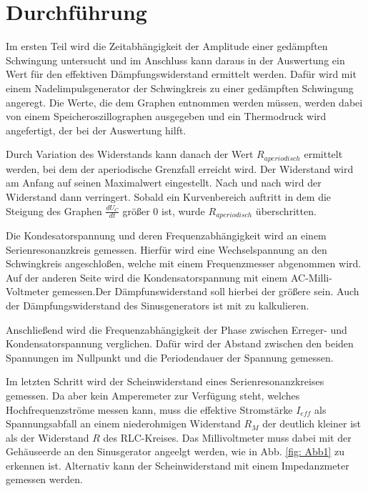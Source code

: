 \section{Durchführung}
\label{sec:durchfuehrung}

Im ersten Teil wird die Zeitabhängigkeit der Amplitude einer gedämpften Schwingung untersucht und im Anschluss kann daraus in der Auswertung ein Wert für den effektiven Dämpfungswiderstand ermittelt werden. 
Dafür wird mit einem Nadelimpulsgenerator der Schwingkreis zu einer gedämpften Schwingung angeregt. 
Die Werte, die dem Graphen entnommen werden müssen, werden dabei von einem Speicheroszillographen ausgegeben und ein Thermodruck wird angefertigt, der bei der Auswertung hilft. 


Durch Variation des Widerstands kann danach der Wert $R_{aperiodisch}$ ermittelt werden, bei dem der aperiodische Grenzfall erreicht wird. 
Der Widerstand wird am Anfang auf seinen Maximalwert eingestellt. Nach und nach wird der Widerstand dann verringert. Sobald ein Kurvenbereich auftritt in dem die Steigung des Graphen $\frac{dU_{C}}{dt}$ größer 0 ist, wurde $R_{aperiodisch}$ überschritten.


Die Kondesatorspannung und deren Frequenzabhängigkeit wird an einem Serienresonanzkreis gemessen. Hierfür wird eine Wechselspannung an den Schwingkreis angeschloßen, welche mit einem Frequenzmesser abgenommen wird. Auf der anderen Seite wird die Kondensatorspannung mit einem AC-Milli-Voltmeter gemessen.Der Dämpfunswiderstand soll hierbei der größere sein. Auch der Dämpfungswiderstand des Sinusgenerators ist mit zu kalkulieren.  

Anschließend wird die Frequenzabhängigkeit der Phase zwischen Erreger- und Kondensatorspannung verglichen. Dafür wird der Abstand zwischen den beiden Spannungen im Nullpunkt und die Periodendauer der Spannung gemessen.

Im letzten Schritt wird der Scheinwiderstand eines Serienresonanzkreises gemessen. Da aber kein Amperemeter zur Verfügung steht, welches Hochfrequenzströme messen kann, muss die effektive Stromstärke $I_{eff}$ als Spannungsabfall an einem niederohmigen Widerstand $R_{M}$ der deutlich kleiner ist als der Widerstand $R$ des RLC-Kreises. Das Millivoltmeter muss dabei mit der Gehäuseerde an den Sinusgerator angeelgt werden, wie in Abb. \ref{fig: Abb1} zu erkennen ist. 
Alternativ kann der Scheinwiderstand mit einem Impedanzmeter gemessen werden. 


